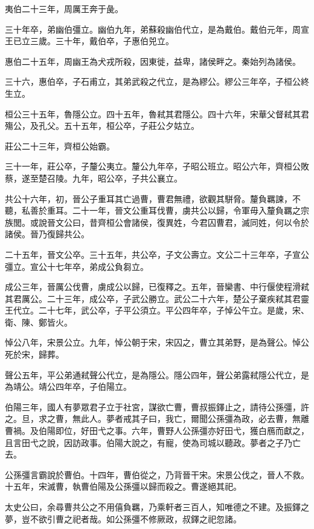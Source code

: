 夷伯二十三年，周厲王奔于彘。

三十年卒，弟幽伯彊立。幽伯九年，弟蘇殺幽伯代立，是為戴伯。戴伯元年，周宣王已立三歲。三十年，戴伯卒，子惠伯兕立。

惠伯二十五年，周幽王為犬戎所殺，因東徙，益卑，諸侯畔之。秦始列為諸侯。

三十六，惠伯卒，子石甫立，其弟武殺之代立，是為繆公。繆公三年卒，子桓公終生立。

桓公三十五年，魯隱公立。四十五年，魯弒其君隱公。四十六年，宋華父督弒其君殤公，及孔父。五十五年，桓公卒，子莊公夕姑立。

莊公二十三年，齊桓公始霸。

三十一年，莊公卒，子釐公夷立。釐公九年卒，子昭公班立。昭公六年，齊桓公敗蔡，遂至楚召陵。九年，昭公卒，子共公襄立。

共公十六年，初，晉公子重耳其亡過曹，曹君無禮，欲觀其駢脅。釐負羈諫，不聽，私善於重耳。二十一年，晉文公重耳伐曹，虜共公以歸，令軍毋入釐負羈之宗族閭。或說晉文公曰，昔齊桓公會諸侯，復異姓，今君囚曹君，滅同姓，何以令於諸侯。晉乃復歸共公。

二十五年，晉文公卒。三十五年，共公卒，子文公壽立。文公二十三年卒，子宣公彊立。宣公十七年卒，弟成公負芻立。

成公三年，晉厲公伐曹，虜成公以歸，已復釋之。五年，晉欒書、中行偃使程滑弒其君厲公。二十三年，成公卒，子武公勝立。武公二十六年，楚公子棄疾弒其君靈王代立。二十七年，武公卒，子平公須立。平公四年卒，子悼公午立。是歲，宋、衛、陳、鄭皆火。

悼公八年，宋景公立。九年，悼公朝于宋，宋囚之，曹立其弟野，是為聲公。悼公死於宋，歸葬。

聲公五年，平公弟通弒聲公代立，是為隱公。隱公四年，聲公弟露弒隱公代立，是為靖公。靖公四年卒，子伯陽立。

伯陽三年，國人有夢眾君子立于社宮，謀欲亡曹，曹叔振鐸止之，請待公孫彊，許之。旦，求之曹，無此人。夢者戒其子曰，我亡，爾聞公孫彊為政，必去曹，無離曹禍。及伯陽即位，好田弋之事。六年，曹野人公孫彊亦好田弋，獲白鴈而獻之，且言田弋之說，因訪政事。伯陽大說之，有寵，使為司城以聽政。夢者之子乃亡去。

公孫彊言霸說於曹伯。十四年，曹伯從之，乃背晉干宋。宋景公伐之，晉人不救。十五年，宋滅曹，執曹伯陽及公孫彊以歸而殺之。曹遂絕其祀。

太史公曰，余尋曹共公之不用僖負羈，乃乘軒者三百人，知唯德之不建。及振鐸之夢，豈不欲引曹之祀者哉。如公孫彊不修厥政，叔鐸之祀忽諸。